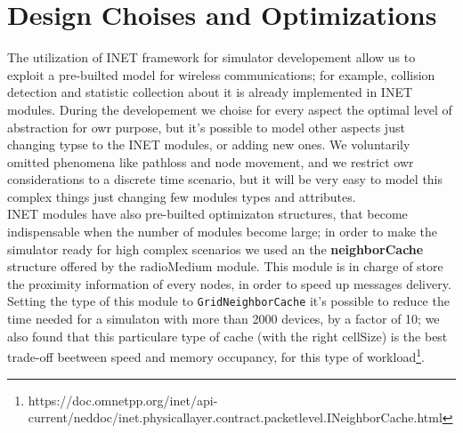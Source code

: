 \section{Design Choises and Optimizations}
The utilization of INET framework for simulator developement allow us to exploit a pre-builted model for wireless communications;
for example, collision detection and statistic collection about it is already implemented in INET modules. During the developement
we choise for every aspect the optimal level of abstraction for owr purpose, but it's possible to model other aspects just 
changing typse to the INET modules, or adding new ones. We voluntarily omitted phenomena like pathloss and node movement, and we 
restrict owr considerations to a discrete time scenario, but it will be very easy to model this complex things just changing
few modules types and attributes. \\
INET modules have also pre-builted optimizaton structures, that become indispensable when the number of modules become large; in order
to make the simulator ready for high complex scenarios we used an the \textbf{neighborCache} structure offered by the radioMedium module.
This module is in charge of store the proximity information of every nodes, in order to speed up messages delivery. Setting the type of this
module to \texttt{GridNeighborCache} it's possible to reduce the time needed for a simulaton with more than 2000 devices, by a factor of 
10; we also found that this particulare type of cache (with the right cellSize) is the best trade-off beetween speed and memory occupancy,
for this type of workload\footnote{https://doc.omnetpp.org/inet/api-current/neddoc/inet.physicallayer.contract.packetlevel.INeighborCache.html}.  
